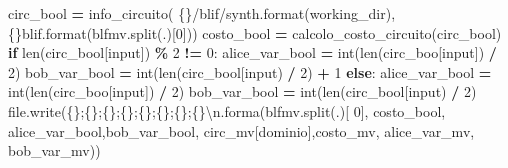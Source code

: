 \documentclass[
  italian,
]{book}
\newenvironment{Shaded}{\begin{snugshade}}{\end{snugshade}}
\newcommand{\BuiltInTok}[1]{#1}
\newcommand{\CharTok}[1]{\textcolor[rgb]{0.31,0.60,0.02}{#1}}
\newcommand{\ControlFlowTok}[1]{\textcolor[rgb]{0.13,0.29,0.53}{\textbf{#1}}}
\newcommand{\DecValTok}[1]{\textcolor[rgb]{0.00,0.00,0.81}{#1}}
\newcommand{\NormalTok}[1]{#1}
\newcommand{\OperatorTok}[1]{\textcolor[rgb]{0.81,0.36,0.00}{\textbf{#1}}}
\newcommand{\SpecialCharTok}[1]{\textcolor[rgb]{0.00,0.00,0.00}{#1}}
\newcommand{\StringTok}[1]{\textcolor[rgb]{0.31,0.60,0.02}{#1}}
\begin{document}
\begin{Shaded}
\begin{Highlighting}[]
\NormalTok{            circ\_bool }\OperatorTok{=}\NormalTok{ info\_circuito(}
                \StringTok{\textquotesingle{}}\SpecialCharTok{\{\}}\StringTok{/blif/synth\textquotesingle{}}\NormalTok{.}\BuiltInTok{format}\NormalTok{(working\_dir), }\StringTok{\textquotesingle{}}\SpecialCharTok{\{\}}\StringTok{blif\textquotesingle{}}\NormalTok{.}\BuiltInTok{format}\NormalTok{(blfmv.split(}\StringTok{\textquotesingle{}.\textquotesingle{}}\NormalTok{)[}\DecValTok{0}\NormalTok{]))}
\NormalTok{            costo\_bool }\OperatorTok{=}\NormalTok{ calcolo\_costo\_circuito(circ\_bool)}
            \ControlFlowTok{if} \BuiltInTok{len}\NormalTok{(circ\_bool[}\StringTok{\textquotesingle{}input\textquotesingle{}}\NormalTok{]) }\OperatorTok{\%} \DecValTok{2} \OperatorTok{!=} \DecValTok{0}\NormalTok{:}
\NormalTok{                alice\_var\_bool }\OperatorTok{=} \BuiltInTok{int}\NormalTok{(}\BuiltInTok{len}\NormalTok{(circ\_boo[}\StringTok{\textquotesingle{}input\textquotesingle{}}\NormalTok{]) }\OperatorTok{/} \DecValTok{2}\NormalTok{)}
\NormalTok{                bob\_var\_bool }\OperatorTok{=} \BuiltInTok{int}\NormalTok{(}\BuiltInTok{len}\NormalTok{(circ\_bool[}\StringTok{\textquotesingle{}input\textquotesingle{}}\NormalTok{) }\OperatorTok{/} \DecValTok{2}\NormalTok{) }\OperatorTok{+} \DecValTok{1}
            \ControlFlowTok{else}\NormalTok{:}
\NormalTok{                alice\_var\_bool }\OperatorTok{=} \BuiltInTok{int}\NormalTok{(}\BuiltInTok{len}\NormalTok{(circ\_boo[}\StringTok{\textquotesingle{}input\textquotesingle{}}\NormalTok{]) }\OperatorTok{/} \DecValTok{2}\NormalTok{)}
\NormalTok{                bob\_var\_bool }\OperatorTok{=} \BuiltInTok{int}\NormalTok{(}\BuiltInTok{len}\NormalTok{(circ\_bool[}\StringTok{\textquotesingle{}input\textquotesingle{}}\NormalTok{) }\OperatorTok{/} \DecValTok{2}\NormalTok{)}
            \BuiltInTok{file}\NormalTok{.write(}\StringTok{\textquotesingle{}}\SpecialCharTok{\{\}}\StringTok{;}\SpecialCharTok{\{\}}\StringTok{;}\SpecialCharTok{\{\}}\StringTok{;}\SpecialCharTok{\{\}}\StringTok{;}\SpecialCharTok{\{\}}\StringTok{;}\SpecialCharTok{\{\}}\StringTok{;}\SpecialCharTok{\{\}}\StringTok{;}\SpecialCharTok{\{\}}\CharTok{\textbackslash{}n}\StringTok{\textquotesingle{}}\NormalTok{.forma(blfmv.split(}\StringTok{\textquotesingle{}.\textquotesingle{}}\NormalTok{)[}
                \DecValTok{0}\NormalTok{], costo\_bool, alice\_var\_bool,bob\_var\_bool, circ\_mv[}\StringTok{\textquotesingle{}dominio\textquotesingle{}}\NormalTok{],costo\_mv, alice\_var\_mv, bob\_var\_mv))}
\end{Highlighting}
\end{Shaded}
\end{document}
